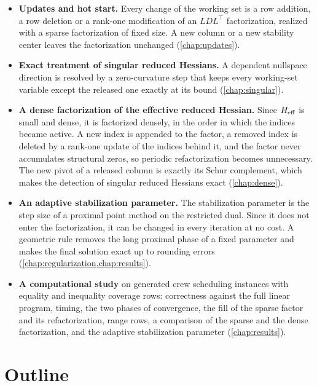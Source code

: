 \begin{itemize}
    \item \textbf{Updates and hot start.} Every change of the working set is a row
          addition, a row deletion or a rank-one modification of an $LDL^\top$
          factorization, realized with a sparse factorization of fixed size. A new column or a
          new stability center leaves the factorization unchanged (\cref{chap:updates}).

    \item \textbf{Exact treatment of singular reduced Hessians.} A dependent nullspace
          direction is resolved by a zero-curvature step that keeps every working-set
          variable except the released one exactly at its bound (\cref{chap:singular}).

    \item \textbf{A dense factorization of the effective reduced Hessian.} Since $H_{\mathrm{eff}}$ is
          small and dense, it is factorized densely, in the order in which the indices became
          active. A new index is appended to the factor, a removed index is deleted by a
          rank-one update of the indices behind it, and the factor never accumulates
          structural zeros, so periodic refactorization becomes unnecessary. The new pivot of a
          released column is exactly its Schur complement, which makes the detection of
          singular reduced Hessians exact (\cref{chap:dense}).

    \item \textbf{An adaptive stabilization parameter.} The stabilization parameter is the
          step size of a proximal point method on the restricted dual. Since it does not
          enter the factorization, it can be changed in every iteration at no cost. A
          geometric rule removes the long proximal phase of a fixed parameter and makes the
          final solution exact up to rounding errors (\cref{chap:regularization,chap:results}).

    \item \textbf{A computational study} on generated crew scheduling instances with equality
          and inequality coverage rows: correctness against the full linear program, timing,
          the two phases of convergence, the fill of the sparse factor and its refactorization,
          range rows, a comparison of the sparse and the dense factorization, and the adaptive
          stabilization parameter (\cref{chap:results}).
\end{itemize}


\section{Outline}

